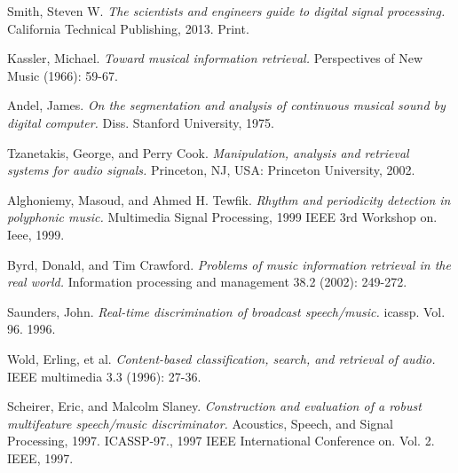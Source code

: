 \newpage
{}
\begin{thebibliography}{9}

                Smith, Steven W.
                \emph{The scientists and engineers guide to digital signal processing.}
                California Technical Publishing, 2013. Print.

                Kassler, Michael. 
                \emph{Toward musical information retrieval.} 
                Perspectives of New Music (1966): 59-67.

                Andel, James. 
                \emph{On the segmentation and analysis of continuous musical sound by digital computer.} 
                Diss. Stanford University, 1975.

                Tzanetakis, George, and Perry Cook. 
                \emph{Manipulation, analysis and retrieval systems for audio signals.} 
                Princeton, NJ, USA: Princeton University, 2002.

                Alghoniemy, Masoud, and Ahmed H. Tewfik. 
                \emph{Rhythm and periodicity detection in polyphonic music.} 
                Multimedia Signal Processing, 1999 IEEE 3rd Workshop on. Ieee, 1999.

                Byrd, Donald, and Tim Crawford. 
                \emph{Problems of music information retrieval in the real world.} 
                Information processing and management 38.2 (2002): 249-272.

                Saunders, John. 
                \emph{Real-time discrimination of broadcast speech/music.} 
                icassp. Vol. 96. 1996.

                Wold, Erling, et al. 
                \emph{Content-based classification, search, and retrieval of audio.} 
                IEEE multimedia 3.3 (1996): 27-36.

                Scheirer, Eric, and Malcolm Slaney. 
                \emph{Construction and evaluation of a robust multifeature speech/music discriminator.} 
                Acoustics, Speech, and Signal Processing, 1997. ICASSP-97., 1997 IEEE International Conference on. Vol. 2. IEEE, 1997.


\end{thebibliography}
